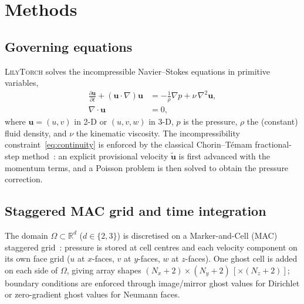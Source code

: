 \documentclass[journal,twoside,10pt]{IEEEtran}
\newcommand{\lilytorch}{\textsc{LilyTorch}\xspace}
\begin{document}
\section{Methods}\label{sec:methods}

\subsection{Governing equations}\label{sec:governing}

\lilytorch solves the incompressible Navier--Stokes equations in
primitive variables,
\begin{align}
  \frac{\partial \mathbf u}{\partial t}
  + (\mathbf u\!\cdot\!\nabla)\mathbf u
  &= -\frac{1}{\rho}\nabla p + \nu\,\nabla^{2}\mathbf u,
  \label{eq:momentum}\\[2pt]
  \nabla\!\cdot\!\mathbf u &= 0,
  \label{eq:continuity}
\end{align}
where $\mathbf u=(u,v)$ in 2-D or $(u,v,w)$ in 3-D, $p$ is the
pressure, $\rho$ the (constant) fluid density, and $\nu$ the kinematic
viscosity.  The incompressibility constraint~\eqref{eq:continuity} is
enforced by the classical Chorin--T\'emam fractional-step
method~\cite{chorin1968numerical,temam1969approximation}:
an explicit provisional velocity $\tilde{\mathbf u}$ is first advanced
with the momentum terms, and a Poisson problem is then solved to
obtain the pressure correction.


\subsection{Staggered MAC grid and time integration}\label{sec:grid}

The domain $\Omega\!\subset\!\mathbb R^{d}$ ($d\!\in\!\{2,3\}$) is
discretised on a Marker-and-Cell (MAC) staggered
grid~\cite{harlow1965numerical}: pressure is stored at cell centres
and each velocity component on its own face grid
($u$ at $x$-faces, $v$ at $y$-faces, $w$ at $z$-faces).  One ghost
cell is added on each side of $\Omega$, giving array shapes
$(N_x{+}2)\!\times\!(N_y{+}2)\,[\times(N_z{+}2)]$; boundary conditions
are enforced through image/mirror ghost values for Dirichlet or
zero-gradient ghost values for Neumann faces.
\end{document}
